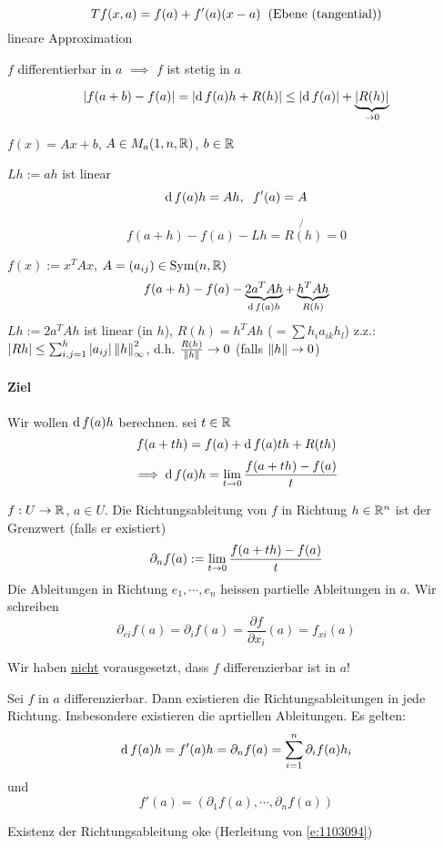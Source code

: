 \begin{Def}
  \[Tf(x,a)=f(a)+f'(a)(x-a)\hspace{2mm}\text{(Ebene (tangential))}\]
  lineare Approximation
\end{Def}
\begin{Sat}
  $f$ differentierbar in $a$ $\implies$ $f$ ist stetig in $a$
\end{Sat}
\begin{Bew}
  \[\left| f(a+b)-f(a) \right|=\left| \operatorname{d} f(a)h+R(h) \right|\leq\left| \operatorname{d} f(a) \right|+\underbrace{\left| R(h) \right|}_{\rightarrow 0}\]
\end{Bew}
\begin{Bsp}
  $f(x)=Ax+b$, $A\in M_a(1,n,\mathbb{R})$, $b\in\mathbb{R}$
  \begin{Beh}
    $Lh:=ah$ ist linear
    \[\operatorname{d} f(a)h=Ah, \hspace{2mm} f'(a)=A\]
  \end{Beh}
  \begin{Bew}
    \[f(a+h)-f(a)-Lh=\not{R(h)}=0\]
  \end{Bew}
\end{Bsp}
\begin{Bsp}
  $f(x):=x^TAx$, $A=(a_{ij})\in\operatorname{Sym}(n,\mathbb{R})$
  \[f(a+h)-f(a)-\underbrace{2a^TAh}_{\operatorname{d} f(a)h}+\underbrace{h^TAh}_{R(h)}\]
  $Lh:=2a^TAh$ ist linear (in $h$), $R(h)=h^TAh$ ($=\sum h_ia_{ik}h_l$)
  z.z.: $\left| Rh \right|\leq\sum^h_{i,j=1}\left| a_{ij} \right|\left\| h \right\|_{\infty}^2$, d.h. $\frac{R(h)}{\left\| h \right\|}\rightarrow 0$ (falls $\left\| h \right\|\rightarrow 0$)
\end{Bsp}
\paragraph{Ziel}
Wir wollen $\operatorname{d} f(a)h$ berechnen. sei $t\in\mathbb{R}$
\[f(a+th)=f(a)+\operatorname{d} f(a)th+R(th)\]
\begin{equation}
  \label{e:1103094}
  \implies \operatorname{d} f(a)h=\displaystyle\lim_{t\rightarrow0}\frac{f(a+th)-f(a)}{t}
\end{equation}
\begin{Def}
  $f:U\rightarrow\mathbb{R}$, $a\in U$. Die Richtungsableitung von $f$ in Richtung $h\in\mathbb{R}^n$ ist der Grenzwert (falls er existiert)
  \[\partial_nf(a):=\displaystyle\lim_{t\rightarrow0}\frac{f(a+th)-f(a)}{t}\]
  Die Ableitungen in Richtung $e_1,\cdots,e_n$ heissen partielle Ableitungen in $a$. Wir schreiben
  \[\partial_{ei}f(a)=\partial_if(a)=\frac{\partial f}{\partial x_i}(a)=f_{xi}(a)\]
\end{Def}
\begin{Bem}
  Wir haben \ul{nicht} vorausgesetzt, dass $f$ differenzierbar ist in $a$!
\end{Bem}
\begin{Sat}
  Sei $f$ in $a$ differenzierbar. Dann existieren die Richtungsableitungen in jede Richtung. Insbesondere existieren die aprtiellen Ableitungen. Es gelten:
  \begin{equation}
    \label{e:1103095}
    \operatorname{d} f(a)h=f'(a)h=\partial_nf(a)=\sum_{i=1}^n\partial_if(a)h_i
  \end{equation}
  und
  \[f'(a)=\left( \partial_1f(a),\cdots,\partial_nf(a) \right)\]
\end{Sat}
\begin{Bew}
  Existenz der Richtungsableitung oke (Herleitung von \ref{e:1103094})
\end{Bew}
